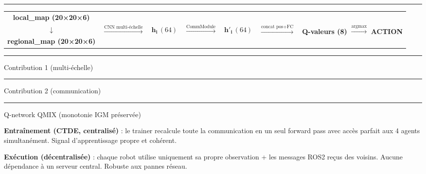 \documentclass[a4paper,landscape]{article}
\begin{document}
\vspace{0.3cm}
\noindent\rule{\linewidth}{1.0pt}
\begin{center}
\begin{tcolorbox}[colback=colNN!8,colframe=colNN,
    fonttitle=\bfseries\normalsize,
    title=Partie 4 — Intégration dans QMIX : flux complet d'une décision,
    arc=5pt,boxrule=1.3pt,width=0.96\linewidth]

\begin{center}
\ttfamily\small
\begin{tabular}{ccccccc}
\textbf{local\_map (20×20×6)} & & & & & & \\
\(\downarrow\) & \multirow{2}{*}{\normalfont\(\xrightarrow{\text{CNN multi-échelle}}\)}
& \multirow{2}{*}{\normalfont\(\mathbf{h_i}\,(64)\)}
& \multirow{2}{*}{\normalfont\(\xrightarrow{\text{CommModule}}\)}
& \multirow{2}{*}{\normalfont\(\mathbf{h'_i}\,(64)\)}
& \multirow{2}{*}{\normalfont\(\xrightarrow{\text{concat pos}+\text{FC}}\)}
& \multirow{2}{*}{\normalfont\textbf{Q-valeurs (8)} \(\xrightarrow{\text{argmax}}\) \textbf{ACTION}} \\
\textbf{regional\_map (20×20×6)} & & & & & & \\
\end{tabular}

\vspace{0.15cm}
{\normalfont\small
\textcolor{colAgent}{\rule{1.2cm}{2pt}} Contribution 1 (multi-échelle)
\quad\quad
\textcolor{colTrainer}{\rule{1.2cm}{2pt}} Contribution 2 (communication)
\quad\quad
\textcolor{colROS}{\rule{1.2cm}{2pt}} Q-network QMIX (monotonie IGM préservée)
}
\end{center}

\vspace{0.1cm}
\begin{multicols}{2}
\small
\textbf{Entraînement (CTDE, centralisé)} : le trainer recalcule toute la
communication en un seul forward pass avec accès parfait aux 4 agents
simultanément. Signal d'apprentissage propre et cohérent.

\columnbreak

\textbf{Exécution (décentralisée)} : chaque robot utilise uniquement sa
propre observation + les messages ROS2 reçus des voisins.
Aucune dépendance à un serveur central. Robuste aux pannes réseau.
\end{multicols}

\end{tcolorbox}
\end{center}

\restoregeometry
\end{document}
